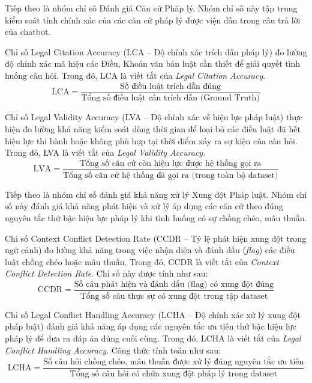 \documentclass[../DoAn.tex]{subfiles}
\begin{document}
Tiếp theo là nhóm chỉ số Đánh giá Căn cứ Pháp lý. Nhóm chỉ số này tập trung kiểm soát tính chính xác của các căn cứ pháp lý được viện dẫn trong câu trả lời của chatbot.

Chỉ số Legal Citation Accuracy (LCA -- Độ chính xác trích dẫn pháp lý) đo lường độ chính xác mã hiệu các Điều, Khoản văn bản luật cần thiết để giải quyết tình huống câu hỏi. Trong đó, LCA là viết tắt của \textit{Legal Citation Accuracy}.
\begin{equation}
\label{eq:lca_metric}
\text{LCA} = \frac{\text{Số điều luật trích dẫn đúng}}{\text{Tổng số điều luật cần trích dẫn (Ground Truth)}}
\end{equation}

Chỉ số Legal Validity Accuracy (LVA -- Độ chính xác về hiệu lực pháp luật) thực hiện đo lường khả năng kiểm soát dòng thời gian để loại bỏ các điều luật đã hết hiệu lực thi hành hoặc không phù hợp tại thời điểm xảy ra sự kiện của câu hỏi. Trong đó, LVA là viết tắt của \textit{Legal Validity Accuracy}.
\begin{equation}
\label{eq:lva_metric}
\text{LVA} = \frac{\text{Tổng số căn cứ còn hiệu lực được hệ thống gọi ra}}{\text{Tổng số căn cứ hệ thống đã gọi ra (trong toàn bộ dataset)}}
\end{equation}

Tiếp theo là nhóm chỉ số đánh giá khả năng xử lý Xung đột Pháp luật. Nhóm chỉ số này đánh giá khả năng phát hiện và xử lý áp dụng các căn cứ theo đúng nguyên tắc thứ bậc hiệu lực pháp lý khi tình huống có sự chồng chéo, mâu thuẫn.

Chỉ số Context Conflict Detection Rate (CCDR -- Tỷ lệ phát hiện xung đột trong ngữ cảnh) đo lường khả năng trong việc nhận diện và đánh dấu (\textit{flag}) các điều luật chồng chéo hoặc mâu thuẫn. Trong đó, CCDR là viết tắt của \textit{Context Conflict Detection Rate}. Chỉ số này được tính như sau:
\begin{equation}
\label{eq:ccdr_metric}
\text{CCDR} = \frac{\text{Số câu phát hiện và đánh dấu (flag) có xung đột đúng}}{\text{Tổng số câu thực sự có xung đột trong tập dataset}}
\end{equation}

Chỉ số Legal Conflict Handling Accuracy (LCHA -- Độ chính xác xử lý xung đột pháp luật) đánh giá khả năng áp dụng các nguyên tắc ưu tiên thứ bậc hiệu lực pháp lý để đưa ra đáp án đúng cuối cùng. Trong đó, LCHA là viết tắt của \textit{Legal Conflict Handling Accuracy}. Công thức tính toán như sau:
\begin{equation}
\label{eq:lcha_metric}
\text{LCHA} = \frac{\text{Số câu hỏi chồng chéo, mâu thuẫn được xử lý đúng nguyên tắc ưu tiên}}{\text{Tổng số câu hỏi có chứa xung đột pháp lý trong dataset}}
\end{equation}
\end{document}
